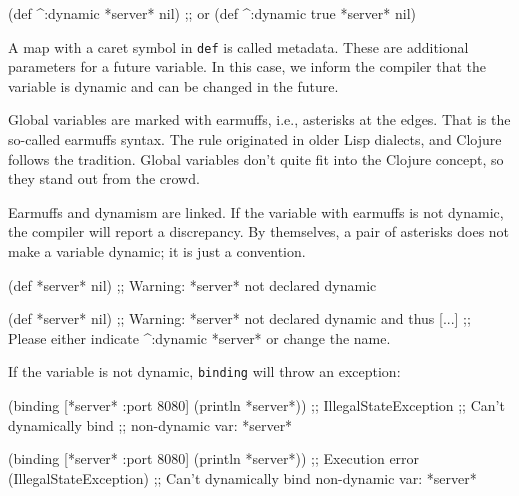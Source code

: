 \begin{clojure}
(def ^:dynamic *server* nil)
;; or
(def ^{:dynamic true} *server* nil)
\end{clojure}

A map with a caret symbol in \verb|def| is called metadata.
These are additional parameters for a future variable.
In this case, we inform the compiler that the variable is dynamic and can be changed in the future.

Global variables are marked with earmuffs, i.e., asterisks at the edges.
That is the so-called earmuffs syntax.
The rule originated in older Lisp dialects, and Clojure follows the tradition.
Global variables don't quite fit into the Clojure concept, so they stand out from the crowd.


Earmuffs and dynamism are linked.
If the variable with earmuffs is not dynamic, the compiler will report a discrepancy.
By themselves, a pair of asterisks does not make a variable dynamic; it is just a convention.

\ifx\DEVICETYPE\MOBILE

\begin{clojure}
(def *server* nil)
;; Warning: *server* not declared dynamic
\end{clojure}

\else

\begin{clojure}
(def *server* nil)
;; Warning: *server* not declared dynamic and thus [...]
;; Please either indicate ^:dynamic *server* or change the name.
\end{clojure}

\fi

\noindent
If the variable is not dynamic, \verb|binding| will throw an exception:

\ifx\DEVICETYPE\MOBILE

\begin{clojure}
(binding [*server* {:port 8080}]
  (println *server*))
;; IllegalStateException
;; Can't dynamically bind
;; non-dynamic var: *server*
\end{clojure}

\else

\begin{clojure}
(binding [*server* {:port 8080}]
  (println *server*))
;; Execution error (IllegalStateException)
;; Can't dynamically bind non-dynamic var: *server*
\end{clojure}


